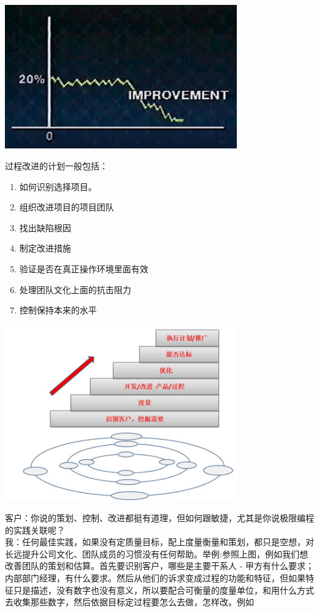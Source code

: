 \documentclass{book}        %
\providecommand{\tightlist}{%
  \setlength{\itemsep}{0pt}\setlength{\parskip}{0pt}}
\begin{document}
\includegraphics[width=10cm]{JuranImprovementScreenshot_2022-10-23_211444.jpg}

过程改进的计划一般包括：

\begin{enumerate}
\tightlist
\item
  如何识别选择项目。
\item
  组织改进项目的项目团队
\item
  找出缺陷根因
\item
  制定改进措施
\item
  验证是否在真正操作环境里面有效
\item
  处理团队文化上面的抗击阻力
\item
  控制保持本来的水平\\
\end{enumerate}


\includegraphics[width=10cm]{IntroXPnJuranStepsScreenshot_2022-10-27_194505.jpg}

客户：你说的策划、控制、改进都挺有道理，但如何跟敏捷，尤其是你说极限编程的实践关联呢？\\
我：任何最佳实践，如果没有定质量目标，配上度量衡量和策划，都只是空想，对长远提升公司文化、团队成员的习惯没有任何帮助。举例:参照上图，例如我们想改善团队的策划和估算。首先要识别客户，哪些是主要干系人
-
甲方有什么要求；内部部门经理，有什么要求。然后从他们的诉求变成过程的功能和特征，但如果特征只是描述，没有数字也没有意义，所以要配合可衡量的度量单位，和用什么方式去收集那些数字，然后依据目标定过程要怎么去做，怎样改。例如
\end{document}
